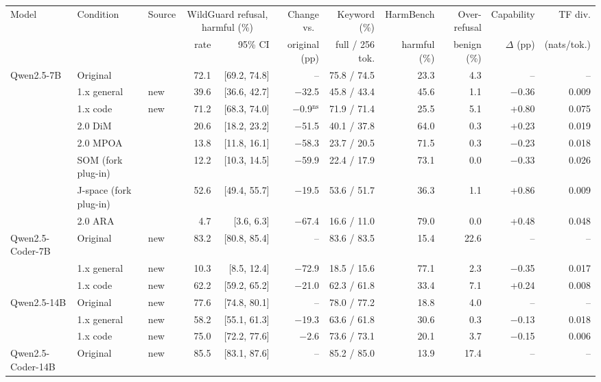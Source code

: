 \begin{tabular}{@{}lllrrrrrrrr@{}}
\toprule
Model & Condition & Source & \multicolumn{2}{c}{WildGuard refusal, harmful (\%)} & Change vs.\ & Keyword (\%) & HarmBench & Over-refusal & Capability & TF div. \\
 & & & rate & 95\% CI & original (pp) & full / 256 tok. & harmful (\%) & benign (\%) & $\Delta$ (pp) & (nats/tok.) \\
\midrule
Qwen2.5-7B & Original & \cite{young2026harder} & 72.1 & [69.2, 74.8] & -- & 75.8 / 74.5 & 23.3 & 4.3 & -- & -- \\
 & 1.x general & new & 39.6 & [36.6, 42.7] & $-$32.5 & 45.8 / 43.4 & 45.6 & 1.1 & $-$0.36 & 0.009 \\
 & 1.x code & new & 71.2 & [68.3, 74.0] & $-$0.9$^{\mathrm{ns}}$ & 71.9 / 71.4 & 25.5 & 5.1 & +0.80 & 0.075 \\
 & 2.0 DiM & \cite{young2026harder} & 20.6 & [18.2, 23.2] & $-$51.5 & 40.1 / 37.8 & 64.0 & 0.3 & +0.23 & 0.019 \\
 & 2.0 MPOA & \cite{young2026harder} & 13.8 & [11.8, 16.1] & $-$58.3 & 23.7 / 20.5 & 71.5 & 0.3 & $-$0.23 & 0.018 \\
 & SOM (fork plug-in) & \cite{young2026harder} & 12.2 & [10.3, 14.5] & $-$59.9 & 22.4 / 17.9 & 73.1 & 0.0 & $-$0.33 & 0.026 \\
 & J-space (fork plug-in) & \cite{young2026harder} & 52.6 & [49.4, 55.7] & $-$19.5 & 53.6 / 51.7 & 36.3 & 1.1 & +0.86 & 0.009 \\
 & 2.0 ARA & \cite{young2026harder} & 4.7 & [3.6, 6.3] & $-$67.4 & 16.6 / 11.0 & 79.0 & 0.0 & +0.48 & 0.048 \\
\addlinespace[2pt]
Qwen2.5-Coder-7B & Original & new & 83.2 & [80.8, 85.4] & -- & 83.6 / 83.5 & 15.4 & 22.6 & -- & -- \\
 & 1.x general & new & 10.3 & [8.5, 12.4] & $-$72.9 & 18.5 / 15.6 & 77.1 & 2.3 & $-$0.35 & 0.017 \\
 & 1.x code & new & 62.2 & [59.2, 65.2] & $-$21.0 & 62.3 / 61.8 & 33.4 & 7.1 & +0.24 & 0.008 \\
\addlinespace[2pt]
Qwen2.5-14B & Original & new & 77.6 & [74.8, 80.1] & -- & 78.0 / 77.2 & 18.8 & 4.0 & -- & -- \\
 & 1.x general & new & 58.2 & [55.1, 61.3] & $-$19.3 & 63.6 / 61.8 & 30.6 & 0.3 & $-$0.13 & 0.018 \\
 & 1.x code & new & 75.0 & [72.2, 77.6] & $-$2.6 & 73.6 / 73.1 & 20.1 & 3.7 & $-$0.15 & 0.006 \\
\addlinespace[2pt]
Qwen2.5-Coder-14B & Original & new & 85.5 & [83.1, 87.6] & -- & 85.2 / 85.0 & 13.9 & 17.4 & -- & -- \\

\end{tabular}
